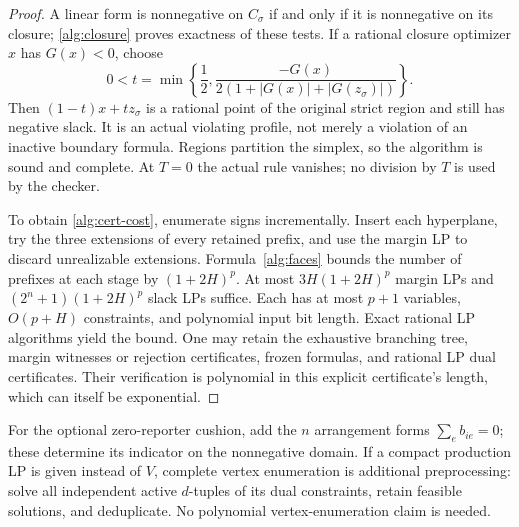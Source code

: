 \documentclass[11pt]{article}
\theoremstyle{definition}\newtheorem{definition}[theorem]{Definition}
\theoremstyle{remark}\newtheorem{remark}[theorem]{Remark}
\begin{document}
\begin{proof}
A linear form is nonnegative on $C_\sigma$ if and only if it is nonnegative
on its closure; \eqref{alg:closure} proves exactness of these tests.
If a rational closure optimizer $x$ has $G(x)<0$, choose
\[
 0<t=\min\left\{\frac12,
       \frac{-G(x)}{2(1+|G(x)|+|G(z_\sigma)|)}\right\}.
\]
Then $(1-t)x+t z_\sigma$ is a rational point of the original strict region
and still has negative slack.  It is an actual violating profile, not merely
a violation of an inactive boundary formula.  Regions partition the simplex,
so the algorithm is sound and complete.  At $T=0$ the actual rule vanishes;
no division by $T$ is used by the checker.

To obtain \eqref{alg:cert-cost}, enumerate signs incrementally.  Insert each
hyperplane, try the three extensions of every retained prefix, and use the
margin LP to discard unrealizable extensions.  Formula~\eqref{alg:faces}
bounds the number of prefixes at each stage by $(1+2H)^p$.
At most $3H(1+2H)^p$ margin LPs and
$(2^n+1)(1+2H)^p$ slack LPs suffice.  Each has at most $p+1$ variables,
$O(p+H)$ constraints, and polynomial input bit length.  Exact rational LP
algorithms yield the bound.  One may retain the exhaustive branching tree,
margin witnesses or rejection certificates, frozen formulas, and rational
LP dual certificates.  Their verification is polynomial in this explicit
certificate's length, which can itself be exponential.
\end{proof}
For the optional zero-reporter cushion, add the $n$ arrangement forms
$\sum_e b_{ie}=0$; these determine its indicator on the nonnegative domain.
If a compact production LP is given instead of $V$, complete vertex
enumeration is additional preprocessing: solve all independent active
$d$-tuples of its dual constraints, retain feasible solutions, and deduplicate.
No polynomial vertex-enumeration claim is needed.
\end{document}
